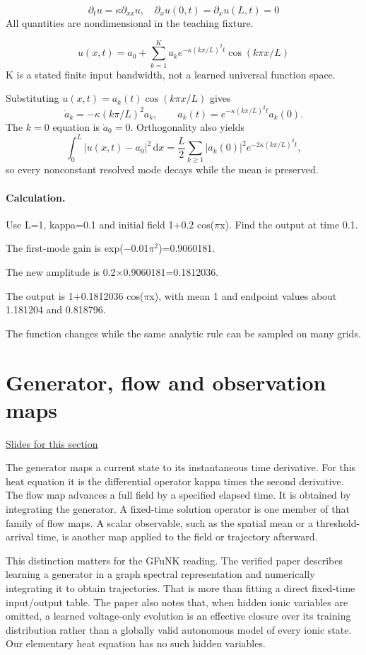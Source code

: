 \documentclass[11pt,letterpaper]{article}
\theoremstyle{definition}\newtheorem{definition}{Definition}\newtheorem{example}{Example}
\numberwithin{equation}{section}
\begin{document}
\[
\partial_t u=\kappa\partial_{xx}u,\quad\partial_xu(0,t)=\partial_xu(L,t)=0
\]
All quantities are nondimensional in the teaching fixture.

\[
u(x,t)=a_0+\sum_{k=1}^K a_k e^{-\kappa(k\pi/L)^2t}\cos(k\pi x/L)
\]
K is a stated finite input bandwidth, not a learned universal function space.

Substituting $u(x,t)=a_k(t)\cos(k\pi x/L)$ gives
\[
 \dot a_k=-\kappa(k\pi/L)^2a_k,
 \qquad a_k(t)=e^{-\kappa(k\pi/L)^2t}a_k(0).
\]
The $k=0$ equation is $\dot a_0=0$. Orthogonality also yields
\[
 \int_0^L|u(x,t)-a_0|^2\,\mathrm dx
 =\frac L2\sum_{k\ge1}|a_k(0)|^2e^{-2\kappa(k\pi/L)^2t},
\]
so every nonconstant resolved mode decays while the mean is preserved.

\paragraph{Calculation.} Use L=1, kappa=0.1 and initial field 1+0.2 cos(\ensuremath{\pi}x). Find the output at time 0.1.

The first-mode gain is exp(\ensuremath{-}0.01\ensuremath{\pi}\ensuremath{^{2}})=0.9060181.

The new amplitude is 0.2\ensuremath{\times}0.9060181=0.1812036.

The output is 1+0.1812036 cos(\ensuremath{\pi}x), with mean 1 and endpoint values about 1.181204 and 0.818796.

The function changes while the same analytic rule can be sampled on many grids.
\section{Generator, flow and observation maps}
\hypertarget{note-generator-flow-and-observation-maps}{}\label{note:generator-flow-and-observation-maps}
{\small \href{slides.html\#frame=the-generator\&step=1}{Slides for this section}}\par
The generator maps a current state to its instantaneous time derivative. For this heat equation it is the differential operator kappa times the second derivative. The flow map advances a full field by a specified elapsed time. It is obtained by integrating the generator. A fixed-time solution operator is one member of that family of flow maps. A scalar observable, such as the spatial mean or a threshold-arrival time, is another map applied to the field or trajectory afterward.

This distinction matters for the GFuNK reading. The verified paper describes learning a generator in a graph spectral representation and numerically integrating it to obtain trajectories. That is more than fitting a direct fixed-time input/output table. The paper also notes that, when hidden ionic variables are omitted, a learned voltage-only evolution is an effective closure over its training distribution rather than a globally valid autonomous model of every ionic state. Our elementary heat equation has no such hidden variables.
\end{document}
